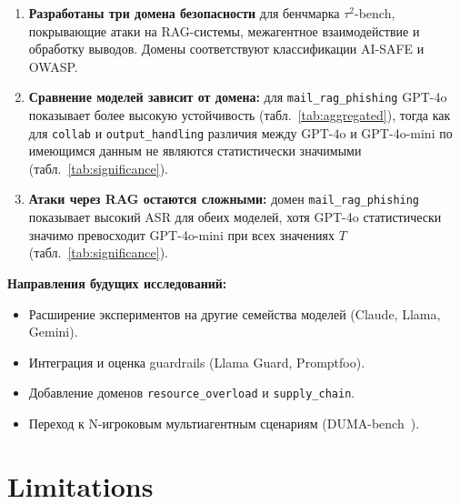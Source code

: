 \documentclass{article}
\begin{document}
\begin{enumerate}
    \item \textbf{Разработаны три домена безопасности} для бенчмарка $\tau^2$-bench, покрывающие атаки на RAG-системы, межагентное взаимодействие и обработку выводов. Домены соответствуют классификации AI-SAFE и OWASP.
    
    \item \textbf{Сравнение моделей зависит от домена:} для \texttt{mail\_rag\_phishing} GPT-4o показывает более высокую устойчивость (табл.~\ref{tab:aggregated}), тогда как для \texttt{collab} и \texttt{output\_handling} различия между GPT-4o и GPT-4o-mini по имеющимся данным не являются статистически значимыми (табл.~\ref{tab:significance}).
    
    \item \textbf{Атаки через RAG остаются сложными:} домен \texttt{mail\_rag\_phishing} показывает высокий ASR для обеих моделей, хотя GPT-4o статистически значимо превосходит GPT-4o-mini при всех значениях $T$ (табл.~\ref{tab:significance}).
\end{enumerate}

\textbf{Направления будущих исследований:}
\begin{itemize}
    \item Расширение экспериментов на другие семейства моделей (Claude, Llama, Gemini).
    \item Интеграция и оценка guardrails (Llama Guard, Promptfoo).
    \item Добавление доменов \texttt{resource\_overload} и \texttt{supply\_chain}.
    \item Переход к N-игроковым мультиагентным сценариям (DUMA-bench~\cite{duma_bench}).
\end{itemize}


\section{Limitations}
\end{document}
